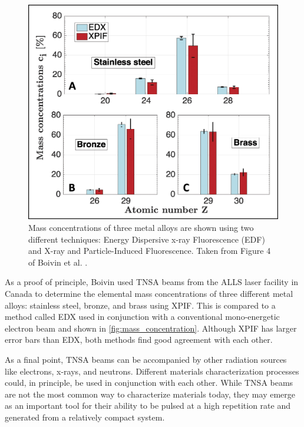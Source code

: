 \begin{figure}
	\centering
	\includegraphics[width=0.6\linewidth]{planning/images/mass_concentration.jpg}
	\caption{Mass concentrations of three metal alloys are shown using two different techniques: Energy Dispersive x-ray Fluorescence (EDF) and X-ray and Particle-Induced Fluorescence. Taken from Figure 4 of Boivin et al. \cite{Boivin_2022_NJoP}.}
	\label{fig:mass_concentration}
\end{figure}

As a proof of principle, Boivin \cite{Boivin_2022_NJoP} used TNSA beams from the \gls{ALLS} laser facility in Canada to determine the elemental mass concentrations of three different metal alloys: stainless steel, bronze, and  brass using \gls{XPIF}. This is compared to a method called \gls{EDX} used in conjunction with a conventional mono-energetic electron beam and shown in \autoref{fig:mass_concentration}. Although XPIF has larger error bars than \gls{EDX}, both methods find good agreement with each other.

As a final point, \gls{TNSA} beams can be accompanied by other radiation sources like electrons, x-rays, and neutrons. Different materials characterization processes could, in principle, be used in conjunction with each other. While \gls{TNSA} beams are not the most common way to characterize materials today, they may emerge as an important tool for their ability to be pulsed at a high repetition rate and generated from a relatively compact system.

